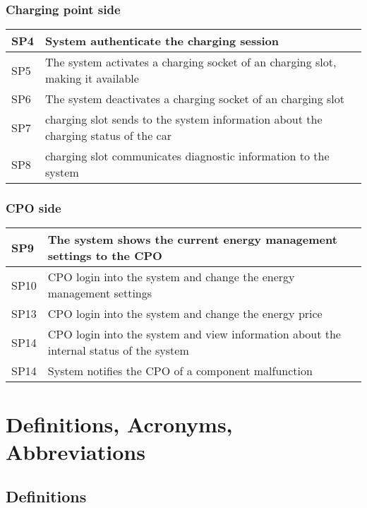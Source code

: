 \documentclass[12pt]{article}
\begin{document}
\subsubsection{Charging point side}
\begin{tabular}{|l|l|}
	\hline
	SP4 & System authenticate the charging session\\
	\hline
	SP5 & The system activates a charging socket of an charging slot, making it available \\
	\hline
	SP6 & The system deactivates a charging socket of an charging slot\\
	\hline
	SP7 & charging slot sends to the system information about the charging status of the car\\
	\hline
	SP8 & charging slot communicates diagnostic information to the system\\
	\hline
\end{tabular}

\subsubsection{CPO side}
\begin{tabular}{|l|l|}
	\hline
	SP9 & The system shows the current energy management settings to the CPO\\
	\hline
	SP10 & CPO login into the system and change the energy management settings\\
	\hline
	SP13 & CPO login into the system and change the energy price\\
	\hline
	SP14 & CPO login into the system and view information about the internal status of the system\\
	\hline
	SP14 & System notifies the CPO of a component malfunction\\
	\hline
\end{tabular}


\section{Definitions, Acronyms, Abbreviations}

\subsection{Definitions}
\end{document}
